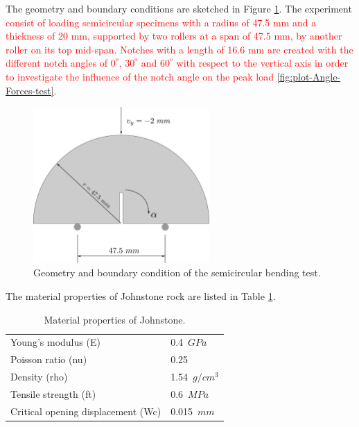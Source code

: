 \documentclass[preprint,12pt,a4paper]{elsarticle}
\newcommand{\PNA}[1]{
  \textcolor{red}{{#1}}
}
\begin{document}
The geometry and boundary conditions are sketched in Figure 
\ref{fig:geometry-Semicircular-bending-test}. The experiment \PNA{consist of loading
semicircular specimens with a radius of 47.5 mm and a thickness of
20 mm, supported by two rollers at a span of 47.5 mm, by
another roller on its top mid-span. Notches with a length of 16.6 mm are
created with the different notch angles of 0$^º$, 30$^º$ and 60$^º$ with respect
to the vertical axis in order to investigate the influence of the
notch angle on the peak load \ref{fig:plot-Angle-Forces-test}.}
\begin{figure}
  \centering
  \includegraphics[width=0.6\textwidth]{./Figure-Semicircular-bending-test}
  \caption{Geometry and boundary condition of the semicircular bending
    test.}
  \label{fig:geometry-Semicircular-bending-test}
\end{figure}
The material properties of Johnstone rock are listed in Table \ref{tab:Johnstone-properties}.
\begin{table}
  \centering
  \begin{tabular}[]{l l}
    \hline
    Young's modulus (\gls{E})   & 0.4\ $GPa$       \\
    Poisson ratio (\gls{nu})    & 0.25           \\
    Density (\gls{rho})         & 1.54\ $g/cm^3$ \\
    Tensile strength (\gls{ft}) & 0.6\ $MPa$       \\
    Critical opening displacement (\gls{Wc}) & 0.015\ $mm$ \\
    \hline
  \end{tabular}
  \caption[Mechanical properties of Johnstone. ]{Material properties of Johnstone.}
  \label{tab:Johnstone-properties}
\end{table}
\end{document}
